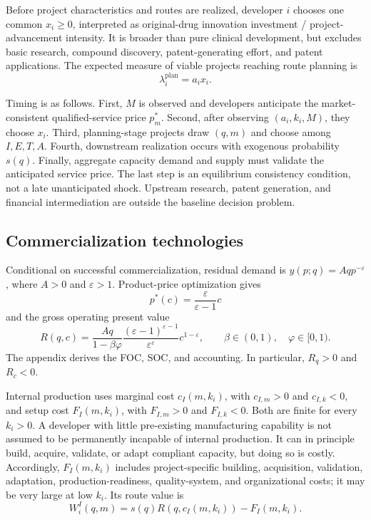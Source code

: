 \documentclass[12pt]{article}
\newcommand{\1}{\mathbf{1}}
\begin{document}
Before project characteristics and routes are realized, developer \(i\)
chooses one common \(x_i\geq0\), interpreted as original-drug innovation
investment / project-advancement intensity. It is broader than pure clinical
development, but excludes basic research, compound discovery,
patent-generating effort, and patent applications. The expected measure of
viable projects reaching route planning is
\begin{equation}
  \lambda_i^{\mathrm{plan}}=a_ix_i.
  \label{eq:p16m-planning}
\end{equation}

Timing is as follows. First, \(M\) is observed and developers anticipate the
market-consistent qualified-service price \(p_m^*\). Second, after observing
\((a_i,k_i,M)\), they choose \(x_i\). Third, planning-stage projects draw
\((q,m)\) and choose among \(I,E,T,A\). Fourth, downstream realization occurs
with exogenous probability \(s(q)\). Finally, aggregate capacity demand and
supply must validate the anticipated service price. The last step is an
equilibrium consistency condition, not a late unanticipated shock. Upstream
research, patent generation, and financial intermediation are outside the
baseline decision problem.

\subsection{Commercialization technologies}
\label{subsec:p16m-technologies}

Conditional on successful commercialization, residual demand is
\(y(p;q)=Aqp^{-\varepsilon}\), where \(A>0\) and \(\varepsilon>1\).
Product-price optimization gives
\[
  p^*(c)=\frac{\varepsilon}{\varepsilon-1}c
\]
and the gross operating present value
\begin{equation}
  R(q,c)
  =
  \frac{Aq}{1-\beta\varphi}
  \frac{(\varepsilon-1)^{\varepsilon-1}}
       {\varepsilon^\varepsilon}
  c^{1-\varepsilon},
  \qquad
  \beta\in(0,1),\quad \varphi\in[0,1).
  \label{eq:p16m-return}
\end{equation}
The appendix derives the FOC, SOC, and accounting. In particular,
\(R_q>0\) and \(R_c<0\).

Internal production uses marginal cost \(c_I(m,k_i)\), with
\(c_{I,m}>0\) and \(c_{I,k}<0\), and setup cost \(F_I(m,k_i)\), with
\(F_{I,m}>0\) and \(F_{I,k}<0\). Both are finite for every \(k_i>0\). A
developer with little pre-existing manufacturing capability is not assumed to
be permanently incapable of internal production. It can in principle build,
acquire, validate, or adapt compliant capacity, but doing so is costly.
Accordingly, \(F_I(m,k_i)\) includes project-specific building, acquisition,
validation, adaptation, production-readiness, quality-system, and
organizational costs; it may be very large at low \(k_i\). Its route value is
\begin{equation}
  W_i^I(q,m)
  =
  s(q)R\!\left(q,c_I(m,k_i)\right)-F_I(m,k_i).
  \label{eq:p16m-internal}
\end{equation}
\end{document}
